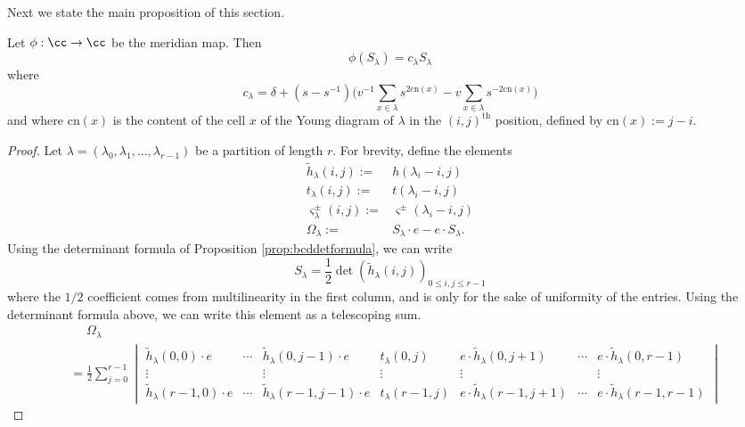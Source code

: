 Next we state the main proposition of this section.
\begin{proposition} \label{prop:schureigenvalues}
Let $\phi: \cc \to \cc$ be the meridian map. Then
\begin{equation}
\phi ( S_\lambda ) = c_\lambda S_\lambda
\end{equation}
where
\begin{equation}
c_\lambda = \delta + ( s - s^{-1} ) \Big( v^{-1} \sum_{x \in \lambda} s^{2 \textrm{cn}(x)} - v \sum_{x \in \lambda} s^{-2 \textrm{cn}(x)} \Big)
\end{equation}
and where $\textrm{cn}(x)$ is the content of the cell $x$ of the Young diagram of $\lambda$ in the $(i,j)^{\textrm{th}}$ position, defined by $\textrm{cn}(x) := j-i$.
\end{proposition}
\begin{proof}
Let $\lambda=(\lambda_0, \lambda_1, \dots, \lambda_{r-1})$ be a partition of length $r$. For brevity, define the elements
\begin{eqnarray*}
\tilde{h}_\lambda (i, j) :=&  h(\lambda_i - i, j) \\
t_\lambda (i, j) :=& t(\lambda_i - i, j) \\
\varsigma_\lambda^\pm (i, j) :=& \varsigma^\pm (\lambda_i - i, j) \\
\Omega_\lambda :=& S_\lambda \cdot e - e \cdot S_\lambda .
\end{eqnarray*}
Using the determinant formula of Proposition \ref{prop:bcddetformula}, we can write
\begin{equation}\label{eq:bcddetformula}
S_\lambda = \frac{1}{2} \det \left( \tilde{h}_\lambda(i, j) \right)_{0 \leq i, j \leq r-1}
\end{equation}
where the $1/2$ coefficient comes from multilinearity in the first column, and is only for the sake of uniformity of the entries. 
Using the determinant formula above, we can write this element as a telescoping sum.
\begin{equation}
\begin{split}
&\quad\,\, \Omega_\lambda \\
&= \frac{1}{2} \sum_{j=0}^{r-1}
\begin{vmatrix}
\tilde{h}_\lambda (0, 0) \cdot e & \cdots & \tilde{h}_\lambda (0, j-1) \cdot e & t_\lambda (0, j) & e \cdot \tilde{h}_\lambda (0, j+1) & \cdots & e \cdot \tilde{h}_\lambda (0, r-1) \\ 
\vdots & & \vdots & \vdots & \vdots & & \vdots \\
\tilde{h}_\lambda (r-1, 0) \cdot e & \cdots & \tilde{h}_\lambda (r-1, j-1) \cdot e & t_\lambda (r-1, j) & e \cdot \tilde{h}_\lambda (r-1, j+1) & \cdots & e \cdot \tilde{h}_\lambda (r-1, r-1)
\end{vmatrix}
\end{split}
\end{equation}


\end{proof}
